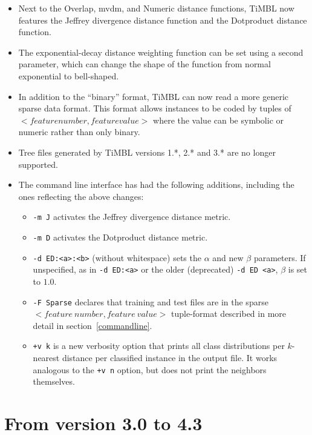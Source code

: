\documentclass{report}
\begin{document}
\begin{itemize}

\item Next to the Overlap, {\sc mvdm}, and Numeric distance functions,
  TiMBL now features the Jeffrey divergence distance function and the
  Dotproduct distance function.

\item The exponential-decay distance weighting function can be set
  using a second parameter, which can change the shape of the function
  from normal exponential to bell-shaped.

\item In addition to the ``binary'' format, TiMBL can now read
  a more generic sparse data format. This format allows instances to
  be coded by tuples of $< feature number, feature value >$ where the
  value can be symbolic or numeric rather than only binary.

\item Tree files generated by TiMBL versions 1.*, 2.* and 3.* are no
longer supported.

\item The command line interface has had the following additions, including the ones reflecting the above changes:

\begin{itemize} 
\item {\tt -m J} activates the Jeffrey divergence distance metric.
\item {\tt -m D} activates the Dotproduct distance metric.
\item {\tt -d ED:<a>:<b>} (without whitespace) sets the $\alpha$ and new
  $\beta$ parameters. If unspecified, as in {\tt -d ED:<a>} or the older
  (deprecated) {\tt -d ED <a>}, $\beta$ is set to $1.0$.
\item {\tt -F Sparse} declares that training and test files are in the
  sparse $< feature\ number, feature\ value >$ tuple-format described in
  more detail in section~\ref{commandline}.
\item {\tt +v k} is a new verbosity option that prints all class
distributions per $k$-nearest distance per classified instance in the
output file. It works analogous to the {\tt +v n} option, but does not
print the neighbors themselves.
\end{itemize}

\end{itemize}

\section{From version 3.0 to 4.3}
\end{document}
